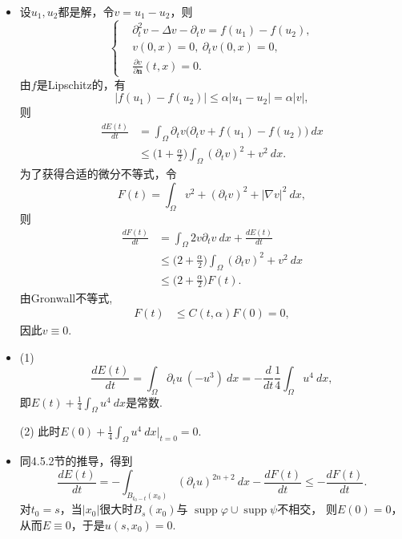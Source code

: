 \begin{itemize}
\item[4.] 设$u_1,u_2$都是解，令$v=u_1-u_2$，则
\begin{equation*}
    \left\{\begin{aligned}
        &\partial^2_t v-\Delta v-\partial_t v=f(u_1)-f(u_2),\\
        &v(0,x)=0,\ \partial_t v(0,x)=0,\\
        &\frac{\partial v}{\partial\boldsymbol{n}}(t,x)=0.
        \end{aligned}\right.
\end{equation*}
由$f$是Lipschitz的，有
$$|f(u_1)-f(u_2)|\leqslant\alpha|u_1-u_2|=\alpha|v|,$$
则\begin{align*}
    \frac{dE(t)}{dt}
    &=\int_\varOmega\partial_t v\big(\partial_t v+f(u_1)-f(u_2)\big)\>dx\\
    &\leqslant\Big(1+\frac{\alpha}{2}\Big)\int_\varOmega(\partial_t v)^2+v^2\>dx.
\end{align*}
为了获得合适的微分不等式，令
$$F(t)=\int_\varOmega v^2+(\partial_t v)^2+|\nabla v|^2\>dx,$$
则
\begin{align*}
    \frac{dF(t)}{dt}&=\int_\varOmega 2v\partial_t v\>dx+\frac{dE(t)}{dt}\\
    &\leqslant\Big(2+\frac{\alpha}{2}\Big)\int_\varOmega(\partial_t v)^2+v^2\>dx\\
    &\leqslant\Big(2+\frac{\alpha}{2}\Big)F(t).
\end{align*}
由Gronwall不等式,
\begin{align*}
    F(t)&\leqslant C(t,\alpha)F(0)=0,
\end{align*}
因此$v\equiv0$.

\item[5.] (1)
$$\frac{dE(t)}{dt}=\int_\varOmega \partial_t u\>(-u^3)\>dx
=-\frac{d}{dt}\frac{1}{4}\int_\varOmega u^4\>dx,$$
即$\displaystyle{E(t)+\frac{1}{4}\int_{\varOmega} u^4\>dx}$是常数.

(2) 此时$\displaystyle{E(0)+\frac{1}{4}\int_{\varOmega} u^4\>dx\Big|_{t=0}=0}$.

\item[6.] 同4.5.2节的推导，得到
$$\frac{dE(t)}{dt}
=-\int_{B_{t_0-t}(x_0)}(\partial_t u)^{2n+2}\>dx-\frac{dF(t)}{dt}
\leqslant-\frac{dF(t)}{dt}.$$
对$t_0=s$，当$|x_0|$很大时$B_{s}(x_0)$与
$\operatorname{supp}\varphi\cup\operatorname{supp}\psi$不相交，
则$E(0)=0$，从而$E\equiv0$，于是$u(s,x_0)=0$.


\end{itemize}
